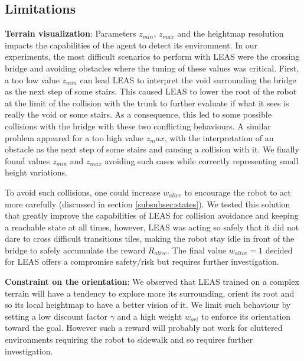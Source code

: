 \subsection{Limitations}
\textbf{Terrain visualization}: 
Parameters $z_{min}$, $z_{max}$ and the heightmap resolution impacts the capabilities of the agent to detect its environment.
In our experiments, the most difficult scenarios to perform with LEAS were the crossing bridge and avoiding obstacles where the tuning of these values was critical.
First, a too low value $z_{min}$ can lead LEAS to interpret the void surrounding the bridge as the next step of some stairs. 
This caused LEAS to lower the root of the robot at the limit of the collision with the trunk to further evaluate if what it sees is really the void or some stairs. 
As a consequence, this led to some possible collisions with the bridge with these two conflicting behaviours.
A similar problem appeared for a too high value $z_max$, with the interpretation of an obstacle as the next step of some stairs and causing a collision with it.
We finally found values $z_{min}$ and $z_{max}$ avoiding such cases while correctly representing small height variations.

To avoid such collisions, one could increase $w_{alive}$ to encourage the robot to act more carefully (discussed in section \ref{subsubsec:states}). 
We tested this solution that greatly improve the capabilities of LEAS for collision avoidance and keeping a reachable state at all times, however, LEAS was acting so safely that it did not dare to cross difficult transitions tiles, making the robot stay idle in front of the bridge to safely accumulate the reward $R_{alive}$. 
The final value $w_{alive}=1$ decided for LEAS offers a compromise safety/risk but requires further investigation. 

\textbf{Constraint on the orientation}: 
We observed that LEAS trained on a complex terrain will have a tendency to explore more its surrounding, orient its root and so its local heightmap to have a better vision of it. 
We limit such behaviour by setting a low discount factor $\gamma$ and a high weight $w_{ori}$ to enforce its orientation toward the goal. 
However such a reward will probably not work for cluttered environments requiring the robot to sidewalk and so requires further investigation.

